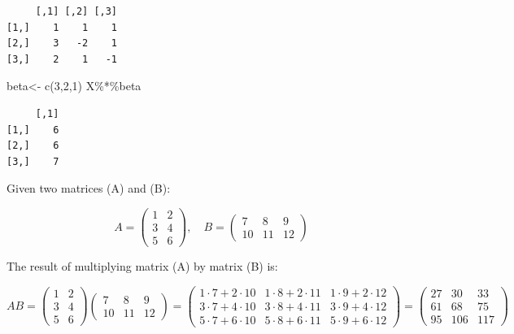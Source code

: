 \documentclass[
  letterpaper,
  DIV=11,
  numbers=noendperiod]{scrartcl}
\newenvironment{Shaded}{\begin{snugshade}}{\end{snugshade}}
\newcommand{\DecValTok}[1]{\textcolor[rgb]{0.68,0.00,0.00}{#1}}
\newcommand{\FunctionTok}[1]{\textcolor[rgb]{0.28,0.35,0.67}{#1}}
\newcommand{\NormalTok}[1]{\textcolor[rgb]{0.00,0.23,0.31}{#1}}
\newcommand{\OtherTok}[1]{\textcolor[rgb]{0.00,0.23,0.31}{#1}}
\newcommand{\SpecialCharTok}[1]{\textcolor[rgb]{0.37,0.37,0.37}{#1}}
\begin{document}
\begin{verbatim}
     [,1] [,2] [,3]
[1,]    1    1    1
[2,]    3   -2    1
[3,]    2    1   -1
\end{verbatim}

\begin{Shaded}
\begin{Highlighting}[]
\NormalTok{beta}\OtherTok{\textless{}{-}} \FunctionTok{c}\NormalTok{(}\DecValTok{3}\NormalTok{,}\DecValTok{2}\NormalTok{,}\DecValTok{1}\NormalTok{)}
\NormalTok{X}\SpecialCharTok{\%*\%}\NormalTok{beta}
\end{Highlighting}
\end{Shaded}

\begin{verbatim}
     [,1]
[1,]    6
[2,]    6
[3,]    7
\end{verbatim}

Given two matrices (A) and (B):

\[
A = \begin{pmatrix}
1 & 2 \\
3 & 4 \\
5 & 6
\end{pmatrix}, \quad
B = \begin{pmatrix}
7 & 8 & 9 \\
10 & 11 & 12
\end{pmatrix}
\]

The result of multiplying matrix (A) by matrix (B) is:

\[
AB = \begin{pmatrix}
1 & 2 \\
3 & 4 \\
5 & 6
\end{pmatrix}
\begin{pmatrix}
7 & 8 & 9 \\
10 & 11 & 12
\end{pmatrix}
= \begin{pmatrix}
1 \cdot 7 + 2 \cdot 10 & 1 \cdot 8 + 2 \cdot 11 & 1 \cdot 9 + 2 \cdot 12 \\
3 \cdot 7 + 4 \cdot 10 & 3 \cdot 8 + 4 \cdot 11 & 3 \cdot 9 + 4 \cdot 12 \\
5 \cdot 7 + 6 \cdot 10 & 5 \cdot 8 + 6 \cdot 11 & 5 \cdot 9 + 6 \cdot 12
\end{pmatrix}
= \begin{pmatrix}
27 & 30 & 33 \\
61 & 68 & 75 \\
95 & 106 & 117
\end{pmatrix}
\]
\end{document}
